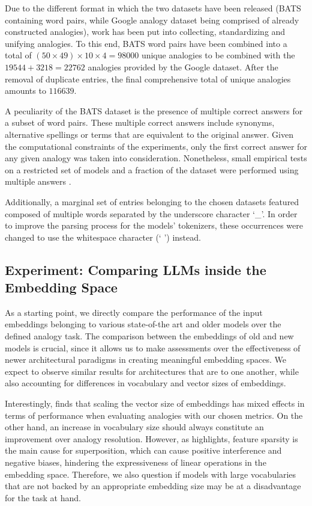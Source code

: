Due to the different format in which the two datasets have been released (BATS containing word pairs, while Google analogy dataset being comprised of already constructed analogies),  work has been put into collecting, standardizing and unifying analogies.
To this end, BATS word pairs have been combined into a total of $(50 \times 49) \times 10 \times 4 = 98000$ unique analogies to be combined with the $19544 + 3218 = 22762$ analogies provided by the Google dataset.
After the removal of duplicate entries, the final comprehensive total of unique analogies amounts to $116639$.

A peculiarity of the BATS dataset is the presence of multiple correct answers for a subset of word pairs.
These multiple correct answers include synonyms, alternative spellings or terms that are equivalent to the original answer.
Given the computational constraints of the experiments, only the first correct answer for any given analogy was taken into consideration.
Nonetheless, small empirical tests on a restricted set of models and a fraction of the dataset were performed using multiple answers .

Additionally, a marginal set of entries belonging to the chosen datasets featured  composed of multiple words separated by the underscore character `\_'.
In order to improve the parsing process for the models' tokenizers, these occurrences were changed to use the whitespace character (` ') instead.

\subsection{Experiment: Comparing LLMs inside the Embedding Space}\label{ssec:exp_emb_exp1}

As a starting point, we directly compare the performance of the input embeddings belonging to various state-of-the art and older models over the defined analogy task.
The comparison between the embeddings of old and new models is crucial, since it allows us to make assessments over the effectiveness of newer architectural paradigms in creating meaningful embedding spaces.
We expect to observe similar results for architectures that are  to one another, while also accounting for differences in vocabulary and vector sizes of embeddings.

Interestingly, \citet{drozd2016} finds that scaling the vector size of embeddings has mixed effects in terms of performance when evaluating analogies with our chosen metrics.
On the other hand, an increase in vocabulary size should always constitute an improvement over analogy resolution.
However, as \citet{elhage2022} highlights, feature sparsity is the main cause for superposition, which can cause positive interference and negative biases, hindering the expressiveness of linear operations in the embedding space.
Therefore, we also question if models with large vocabularies that are not backed by an appropriate embedding size may be at a disadvantage for the task at hand.

